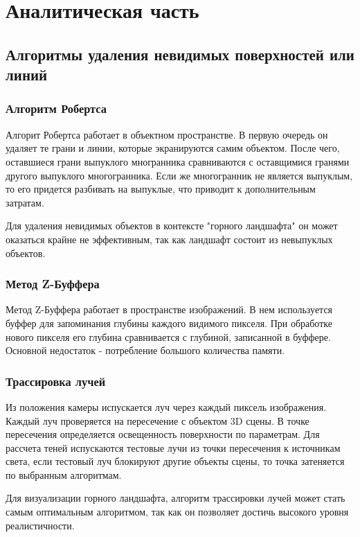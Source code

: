 



\section{Аналитическая часть}
\subsection{Алгоритмы удаления невидимых поверхностей или линий}
\subsubsection{Алгоритм Робертса}
Алгорит Робертса работает в объектном пространстве. В первую очередь он удаляет те грани и линии, которые экранируются самим объектом. После чего, оставшиеся грани выпуклого многранника сравниваются с оставщимися гранями другого выпуклого многогранника. Если же многогранник не является выпуклым, то его придется разбивать на выпуклые, что приводит к дополнительным затратам. 

Для удаления невидимых объектов в контексте "горного ландшафта" он может оказаться крайне не эффективным, так как ландшафт состоит из невыпуклых объектов.

\subsubsection{Метод Z-Буффера} 
Метод Z-Буффера работает в пространстве изображений. В нем используется буффер для запоминания глубины каждого видимого пикселя. При обработке нового пикселя его глубина сравнивается с глубиной, записанной в буффере. Основной недостаток - потребление большого количества памяти. 

\subsubsection{Трассировка лучей}
Из положения камеры испускается луч через каждый пиксель изображения. Каждый луч проверяется на пересечение с объектом 3D сцены. В точке пересечения определяется освещенность поверхности по параметрам. Для рассчета теней испускаются тестовые лучи из точки пересечения к источникам света, если тестовый луч блокируют другие объекты сцены, то точка затеняется по выбранным алгоритмам. 

Для визуализации горного ландшафта, алгоритм трассировки лучей может стать самым оптимальным алгоритмом, так как он позволяет достичь высокого уровня реалистичности.


